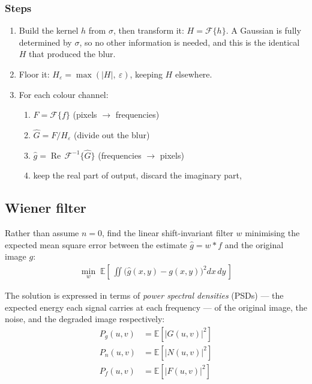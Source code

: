 \documentclass[10pt,twocolumn,letterpaper]{article}
\begin{document}
\subsubsection*{Steps}

\begin{enumerate}
  \item Build the kernel $h$ from $\sigma$, then transform it: $H = \mathcal{F}\{h\}$.
        A Gaussian is fully determined by $\sigma$, so no other information is needed, and
        this is the identical $H$ that produced the blur.
  \item Floor it: $H_{\varepsilon} = \max(|H|,\ \varepsilon)$, keeping $H$ elsewhere.
  \item For each colour channel:
    \begin{enumerate}
      \item $F = \mathcal{F}\{f\}$ \hfill (pixels $\to$ frequencies)
      \item $\hat{G} = F / H_{\varepsilon}$ \hfill (divide out the blur)
      \item $\hat{g} = \operatorname{Re}\,\mathcal{F}^{-1}\{\hat{G}\}$
            \hfill (frequencies $\to$ pixels)
       \item keep the real part of output, discard the imaginary part,
    \end{enumerate}
\end{enumerate}

\newpage
\subsection*{Wiener filter}

Rather than assume $n = 0$, find the linear shift-invariant filter $w$ minimising the expected
mean square error between the estimate $\hat{g} = w * f$ and the original image $g$:
\begin{align}
  \min_{w} \; \mathbb{E}\!\left[\,\iint \bigl(\hat{g}(x,y) - g(x,y)\bigr)^{2} dx\,dy\,\right]
\end{align}

\noindent The solution is expressed in terms of \emph{power spectral densities} (PSDs)
--- the expected energy each signal carries at each frequency --- of the original image,
the noise, and the degraded image respectively:
\begin{align}
  P_{g}(u,v) &= \mathbb{E}\!\left[\left|G(u,v)\right|^{2}\right] \\
  P_{n}(u,v) &= \mathbb{E}\!\left[\left|N(u,v)\right|^{2}\right] \\
  P_{f}(u,v) &= \mathbb{E}\!\left[\left|F(u,v)\right|^{2}\right]
\end{align}
\end{document}

